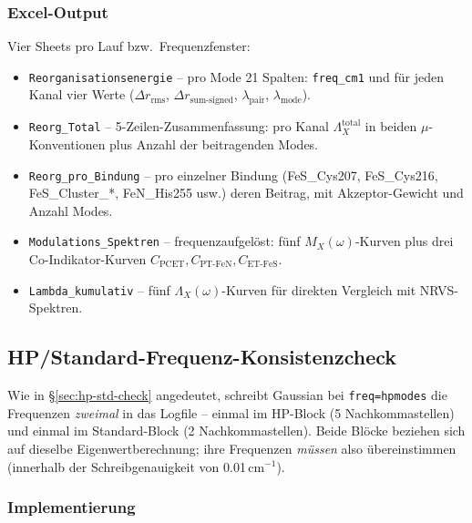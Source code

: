 \documentclass[11pt,a4paper,twoside]{article}
\theoremstyle{remark}
\begin{document}
\subsubsection*{Excel-Output}
\label{sec:reorg-excel}

Vier Sheets pro Lauf bzw.\ Frequenzfenster:

\begin{itemize}
  \item \texttt{Reorganisationsenergie} -- pro Mode 21 Spalten:
        \texttt{freq\_cm1} und f\"ur jeden Kanal vier Werte
        ($\Delta r_\text{rms}$, $\Delta r_\text{sum-signed}$,
        $\lambda_\text{pair}$, $\lambda_\text{mode}$).

  \item \texttt{Reorg\_Total} -- 5-Zeilen-Zusammenfassung: pro Kanal
        $\Lambda_X^\text{total}$ in beiden $\mu$-Konventionen plus
        Anzahl der beitragenden Modes.

  \item \texttt{Reorg\_pro\_Bindung} -- pro einzelner Bindung
        (FeS\_Cys207, FeS\_Cys216, FeS\_Cluster\_*, FeN\_His255 usw.)
        deren Beitrag, mit Akzeptor-Gewicht und Anzahl Modes.

  \item \texttt{Modulations\_Spektren} -- frequenzaufgel\"ost: f\"unf
        $M_X(\omega)$-Kurven plus drei Co-Indikator-Kurven
        $C_\text{PCET}, C_\text{PT-FeN}, C_\text{ET-FeS}$.

  \item \texttt{Lambda\_kumulativ} -- f\"unf $\Lambda_X(\omega)$-Kurven
        f\"ur direkten Vergleich mit NRVS-Spektren.
\end{itemize}


\subsection{HP/Standard-Frequenz-Konsistenzcheck}
\label{sec:hp-std}

Wie in \S\ref{sec:hp-std-check} angedeutet, schreibt Gaussian
bei \texttt{freq=hpmodes} die Frequenzen \emph{zweimal} in das
Logfile -- einmal im HP-Block (5 Nachkommastellen) und einmal im
Standard-Block (2 Nachkommastellen). Beide Bl\"ocke beziehen sich auf
dieselbe Eigenwertberechnung; ihre Frequenzen \emph{m\"ussen} also
\"ubereinstimmen (innerhalb der Schreibgenauigkeit von 0.01\,cm$^{-1}$).

\subsubsection*{Implementierung}
\end{document}
